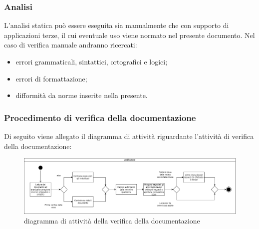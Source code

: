 	\subsubsection{Analisi}
	L'analisi statica può essere eseguita sia manualmente che con supporto di applicazioni terze, il cui eventuale uso viene normato nel presente documento. Nel caso di verifica manuale andranno ricercati:
	\begin{itemize}
	    \item errori grammaticali, sintattici, ortografici e logici;
	    \item errori di formattazione;
	    \item difformità da norme inserite nella presente.
	\end{itemize}
		
		\subsubsection{Procedimento di verifica della documentazione}
		Di seguito viene allegato il diagramma di attività riguardante l'attività di verifica della documentazione:
		\begin{figure}[hbt!]
	       \centering \includegraphics[width=1.0\textwidth]{_template/images/verifica.png}
	        \caption{diagramma di attività della verifica della documentazione}
	    \end{figure}
	

